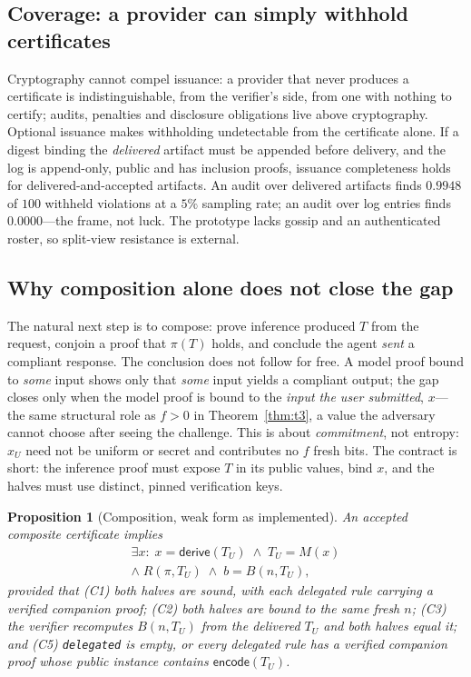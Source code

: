 \documentclass[10pt,journal,compsoc]{IEEEtran}
\newtheorem{proposition}[theorem]{Proposition}
\begin{document}
\subsection{Coverage: a provider can simply withhold certificates}
\label{sec:disc-coverage}

Cryptography cannot compel issuance: a provider that never produces a
certificate is indistinguishable, from the verifier's side, from one with
nothing to certify; audits, penalties and disclosure obligations live above
cryptography. Optional issuance makes withholding undetectable from the
certificate alone. If a digest binding the \emph{delivered} artifact must be
appended before delivery, and the log is append-only, public and has inclusion
proofs, issuance completeness holds for delivered-and-accepted artifacts. An
audit over delivered artifacts finds $0.9948$ of $100$ withheld violations at a
$5\%$ sampling rate; an audit over log entries finds $0.0000$---the frame, not
luck. The prototype lacks gossip and an authenticated roster, so split-view
resistance is external.

\subsection{Why composition alone does not close the gap}
\label{sec:disc-composition}

The natural next step is to compose: prove inference produced $T$ from the
request, conjoin a proof that $\pi(T)$ holds, and conclude the agent \emph{sent}
a compliant response. The conclusion does not follow for free. A model proof
bound to \emph{some} input shows only that \emph{some} input yields a compliant
output; the gap closes only when the model proof is bound to the \emph{input the
user submitted}, $x$---the same structural role as $f > 0$ in
Theorem~\ref{thm:t3}, a value the adversary cannot choose after seeing the
challenge. This is about \emph{commitment}, not entropy: $x_U$ need not be
uniform or secret and contributes no $f$ fresh bits. The contract is short: the
inference proof must expose $T$ in its public values, bind $x$, and the halves
must use distinct, pinned verification keys.

\begin{proposition}[Composition, weak form as implemented]
\label{thm:composition}
An accepted composite certificate implies
\begin{multline*}
\exists x:\; x=\mathsf{derive}(T_U)\;\wedge\; T_U=M(x)\\
\wedge\;R(\pi,T_U)\;\wedge\; b=B(n,T_U),
\end{multline*}
provided that (C1) both halves are sound, with each delegated rule carrying a
verified companion proof; (C2) both halves are bound to the same fresh $n$;
(C3) the verifier recomputes $B(n,T_U)$ from the delivered $T_U$ and both halves
equal it; and (C5) \texttt{delegated} is empty, or every delegated rule has a
verified companion proof whose public instance contains
$\mathsf{encode}(T_U)$.
\end{proposition}
\end{document}
